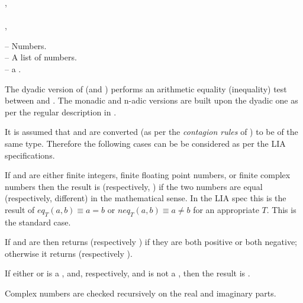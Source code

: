 \documentclass[../Comparisons-Predicates.tex]{subfiles}
\begin{document}
  \index{*!\code{=}}
  \index{*!\code{/=}}
  
  \DSyntax{}
  
  \code{=} ,  \RArrow {}\\
  \code{=}    \RArrow {}\\
  \code{/=} ,  \RArrow {}\\
  \code{/=}    \RArrow {}
  
  \DArgsNValues{}
  
    -- Numbers.\\
   -- A list of numbers.\\
   -- a .
  
  \DDescription{}
  
  The dyadic version of \code{=} (and \code{/=}) performs an arithmetic
  equality (inequality) test between  and .  The
  monadic and n-adic versions are built upon the dyadic one as per the
  regular \CL{} description in \cite{1996:ANSIHyperSpec}.
  
  It is assumed that  and  are converted (as per
  the \emph{contagion rules} of \CL{}) to be of the same type.
  Therefore the following cases can be be considered as per the LIA
  specifications.
  
  \begin{description}
  \item If  and  are either finite integers, finite
  floating point numbers, or finite complex numbers then the result is
   (respectively, ) if the two numbers are
  equal (respectively, different) in the mathematical sense.  In the
  LIA spec this is the result of $\mathit{eq}_T(a, b) \equiv a = b$ or
  $\mathit{neq}_T(a, b) \equiv a \neq b$ for an
  appropriate $T$.  This is the standard \CL{} case.
  
  \item If  and  are  then
  \code{=} returns  (respectively ) if they
  are both positive or both negative; otherwise it returns
   (respectively ).
  
  \item If either  or  is a ,
  and, respectively,  and  is not a
  , then the result is .
  
  \item Complex numbers are checked recursively on the real and imaginary
  parts.
  \end{description}
  
\end{document}
